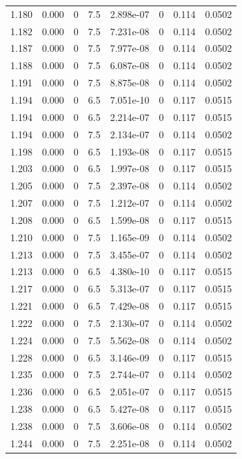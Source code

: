 \documentclass[preview]{standalone}
\begin{document}
{{{{{{{{{{{{{{\begin{tabular}{L{1.2cm}C{1.2cm} C{0.3cm}C{0.5cm} C{1.4cm}C{1.4cm} C{1.4cm}C{1.4cm}}
  1.180  &  0.000  & 0     & 7.5 &  2.898e-07  & 0  & 0.114 &  0.0502   \\ 
  1.182  &  0.000  & 0     & 7.5 &  7.231e-08  & 0  & 0.114 &  0.0502   \\ 
  1.187  &  0.000  & 0     & 7.5 &  7.977e-08  & 0  & 0.114 &  0.0502   \\ 
  1.188  &  0.000  & 0     & 7.5 &  6.087e-08  & 0  & 0.114 &  0.0502   \\ 
  1.191  &  0.000  & 0     & 7.5 &  8.875e-08  & 0  & 0.114 &  0.0502   \\ 
  1.194  &  0.000  & 0     & 6.5 &  7.051e-10  & 0  & 0.117 &  0.0515   \\ 
  1.194  &  0.000  & 0     & 6.5 &  2.214e-07  & 0  & 0.117 &  0.0515   \\ 
  1.194  &  0.000  & 0     & 7.5 &  2.134e-07  & 0  & 0.114 &  0.0502   \\ 
  1.198  &  0.000  & 0     & 6.5 &  1.193e-08  & 0  & 0.117 &  0.0515   \\ 
  1.203  &  0.000  & 0     & 6.5 &  1.997e-08  & 0  & 0.117 &  0.0515   \\ 
  1.205  &  0.000  & 0     & 7.5 &  2.397e-08  & 0  & 0.114 &  0.0502   \\ 
  1.207  &  0.000  & 0     & 7.5 &  1.212e-07  & 0  & 0.114 &  0.0502   \\ 
  1.208  &  0.000  & 0     & 6.5 &  1.599e-08  & 0  & 0.117 &  0.0515   \\ 
  1.210  &  0.000  & 0     & 7.5 &  1.165e-09  & 0  & 0.114 &  0.0502   \\ 
  1.213  &  0.000  & 0     & 7.5 &  3.455e-07  & 0  & 0.114 &  0.0502   \\ 
  1.213  &  0.000  & 0     & 6.5 &  4.380e-10  & 0  & 0.117 &  0.0515   \\ 
  1.217  &  0.000  & 0     & 6.5 &  5.313e-07  & 0  & 0.117 &  0.0515   \\ 
  1.221  &  0.000  & 0     & 6.5 &  7.429e-08  & 0  & 0.117 &  0.0515   \\ 
  1.222  &  0.000  & 0     & 7.5 &  2.130e-07  & 0  & 0.114 &  0.0502   \\ 
  1.224  &  0.000  & 0     & 7.5 &  5.562e-08  & 0  & 0.114 &  0.0502   \\ 
  1.228  &  0.000  & 0     & 6.5 &  3.146e-09  & 0  & 0.117 &  0.0515   \\ 
  1.235  &  0.000  & 0     & 7.5 &  2.744e-07  & 0  & 0.114 &  0.0502   \\ 
  1.236  &  0.000  & 0     & 6.5 &  2.051e-07  & 0  & 0.117 &  0.0515   \\ 
  1.238  &  0.000  & 0     & 6.5 &  5.427e-08  & 0  & 0.117 &  0.0515   \\ 
  1.238  &  0.000  & 0     & 7.5 &  3.606e-08  & 0  & 0.114 &  0.0502   \\ 
  1.244  &  0.000  & 0     & 7.5 &  2.251e-08  & 0  & 0.114 &  0.0502   \\ 
\hline 
\end{tabular} 

}}}}}}}}}}}}}}
\end{document}

